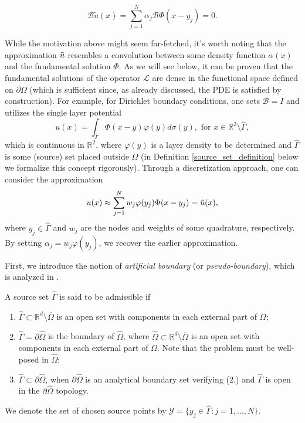 \[
\mathcal{B}\tilde{u}(x) = \sum_{j=1}^{N}\alpha_j \mathcal{B}\Phi(x-y_j) = 0.
\]



\begin{remark}\label{chatp_numerical_remark_conv_motivation}
    While the motivation above might seem far-fetched, it's worth noting that the approximation $\Tilde{u}$ resembles a convolution between some density function $\alpha(x)$ and the fundamental solution $\Phi$. As we will see below, it can be proven that the fundamental solutions of the operator $\mathcal{L}$ are dense in the functional space defined on $\partial\Omega$ (which is sufficient since, as already discussed, the \ac{PDE} is satisfied by construction). For example, for Dirichlet boundary conditions, one sets $\mathcal{B} = I$ and utilizes the single layer potential
    \[
        u(x) = \int_{\hat{\Gamma}}\Phi(x-y)\varphi(y)d\sigma(y), \text{ for } x \in \mathbb{R}^2\setminus \hat{\Gamma},
    \]
    which is continuous in $\mathbb{R}^2$, where $\varphi(y)$ is a layer density to be determined and \(\hat{\Gamma}\) is some (source) set placed outside \(\Omega\) (in Definition \ref{source_set_definition} below we formalize this concept rigorously). Through a discretization approach, one can consider the approximation
    \begin{equation}\label{MFS_approx_disc}
    u(x) \approx \sum_{j=1}^{N}w_j \varphi(y_j) \Phi(x-y_j) = \Tilde{u}(x),
    \end{equation}
    where $y_j \in \hat{\Gamma}$ and $w_j$ are the nodes and weights of some quadrature, respectively. By setting $\alpha_j = w_j \varphi(y_j)$, we recover the earlier approximation.

\end{remark}
First, we introduce the notion of \textit{artificial boundary} (or \textit{pseudo-boundary}), which is analyzed in \cite{alves2009choice}.
\begin{definition}\label{source_set_definition}
    A source set \(\hat{\Gamma}\) is said to be admissible if
    \begin{enumerate}
        \item \(\hat{\Gamma} \subset \mathbb{R}^d\setminus \overline{\Omega}\) is an open set with components in each external part of \(\Omega\);
        \item \label{source_set_definition_2} \(\hat{\Gamma} = \partial \hat{\Omega}\) is the boundary of \(\hat{\Omega}\), where \(\hat{\Omega} \subset \mathbb{R}^d\setminus\overline{\Omega}\) is an open set with components in each external part of \(\Omega\). Note that the problem must be well-posed in \(\hat{\Omega}\);
        \item \(\hat{\Gamma} \subset \partial \hat{\Omega}\), when \(\partial \hat{\Omega}\) is an analytical boundary set verifying (2.) and \(\hat{\Gamma}\) is open in the \(\partial \hat{\Omega}\) topology.
    \end{enumerate}
    We denote the set of chosen source points by \(\mathcal{Y} = \{y_j \in \hat{\Gamma}: j=1,\dots,N\}\).
\end{definition}
